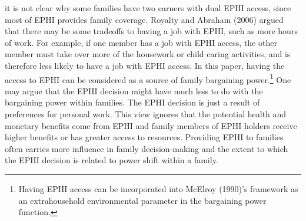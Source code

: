 \documentclass[legno,11pt]{article}
\begin{document}
it is not clear why some families have two earners with dual EPHI
access, since most of EPHI provides family coverage. Royalty and
Abraham (2006) argued that there may be some tradeoffs to having a
job with EPHI, such as more hours of work. For example, if one
member has a job with EPHI access, the other member must take over
more of the housework or child caring activities, and is therefore
less likely to have a job with EPHI access. In this paper, having
the access to EPHI can be considered as a source of family
bargaining power.\footnote{Having EPHI access can be incorporated
into McElroy (1990)'s framework as an extrahousehold environmental
parameter in the bargaining power function.} One may argue that the
EPHI decision might have much less to do with the bargaining power
within families. The EPHI decision is just a result of preferences
for personal work. This view ignores that the potential health and
monetary benefits come from EPHI and family members of EPHI holders
receive higher benefits or has greater access to resources.
Providing EPHI to families often carries more influence in family
decision-making and the extent to which the EPHI decision is related
to power shift within a family.
\end{document}
